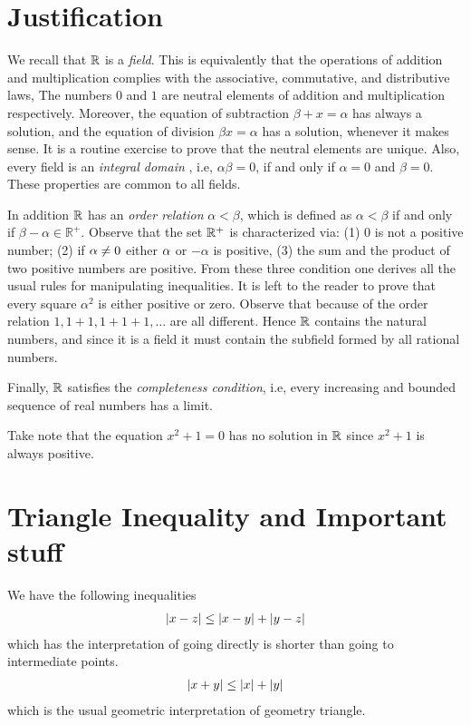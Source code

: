  
 
 \section{Justification}
 We recall that $ \mathbb{R} $ is a \emph{field}. This is equivalently that the operations of addition and multiplication complies with the associative, commutative, and distributive laws, The numbers $0$ and $1$ are neutral elements of addition and multiplication respectively. Moreover, the equation of subtraction $ \beta + x = \alpha $ has always a solution, and the equation of division $ \beta x = \alpha $ has a solution, whenever it makes sense. It is a routine exercise to prove that the neutral elements are unique. Also, every field is an \emph{integral domain }, i.e, $ \alpha \beta = 0 $, if and only if $ \alpha = 0$ and $ \beta = 0 $. These properties are common to all fields.
 
 In addition $\mathbb{R}$ has an \emph{order relation} $ \alpha < \beta $, which is defined as $ \alpha < \beta $ if and only if $ \beta - \alpha \in \mathbb{R}^+ $. Observe that the set $ \mathbb{R}^+ $ is characterized via: (1) 0 is not a positive number; (2) if $ \alpha \neq 0 $ either $ \alpha $ or $ -\alpha $ is positive, (3) the sum and the product of two positive numbers are positive. From these three condition one derives all the usual rules for manipulating inequalities. It is left to the reader to prove that every square $ \alpha^2 $ is either positive or zero. Observe that because of the order relation $1, 1+1, 1+1+1, \ldots $ are all different. Hence $ \mathbb{R} $ contains the natural numbers, and since it is a field it must contain the subfield formed by all rational numbers.
 
 Finally, $ \mathbb{R}$ satisfies the \emph{completeness condition}, i.e, every increasing and bounded sequence of real numbers has a limit.
 
 Take note that the equation $ x^2 + 1 =0 $ has no solution in $ \mathbb{R} $ since $ x^2 + 1 $ is always positive.
 
\section*{Triangle Inequality and Important stuff}
We have the following inequalities
\begin{align*}
\left| x - z \right| \leq \left| x - y \right| + \left| y - z \right| \\
\end{align*} 
which has the interpretation of going directly is shorter than going to intermediate points.
\begin{align*}
\left| x + y \right| \leq \left| x \right| + \left| y \right|
\end{align*}
which is the usual geometric interpretation of geometry triangle.

